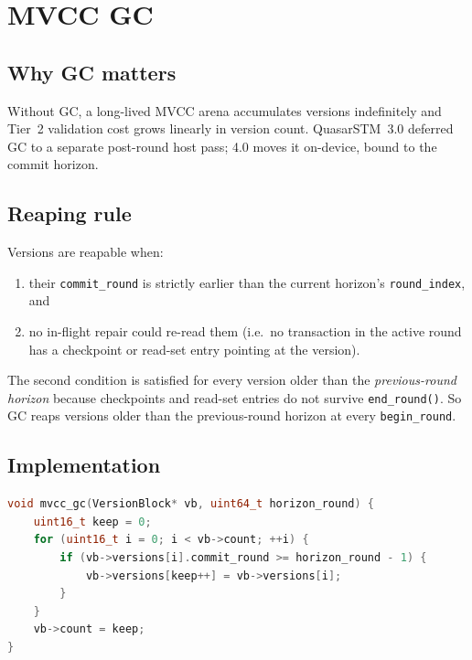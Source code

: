 \section{MVCC GC}

\label{sec:gc}

\subsection{Why GC matters}

Without GC, a long-lived MVCC arena accumulates versions indefinitely
and Tier~2 validation cost grows linearly in version count.
QuasarSTM~3.0 deferred GC to a separate post-round host pass; 4.0
moves it on-device, bound to the commit horizon.

\subsection{Reaping rule}

Versions are reapable when:
\begin{enumerate}[leftmargin=2em]
\item their \texttt{commit\_round} is strictly earlier than the current
      horizon's \texttt{round\_index}, and
\item no in-flight repair could re-read them (i.e.\ no transaction in
      the active round has a checkpoint or read-set entry pointing at
      the version).
\end{enumerate}

The second condition is satisfied for every version older than the
\emph{previous-round horizon} because checkpoints and read-set entries
do not survive \texttt{end\_round()}. So GC reaps versions older than
the previous-round horizon at every \texttt{begin\_round}.

\subsection{Implementation}

\begin{lstlisting}[language=C++]
void mvcc_gc(VersionBlock* vb, uint64_t horizon_round) {
    uint16_t keep = 0;
    for (uint16_t i = 0; i < vb->count; ++i) {
        if (vb->versions[i].commit_round >= horizon_round - 1) {
            vb->versions[keep++] = vb->versions[i];
        }
    }
    vb->count = keep;
}
\end{lstlisting}

